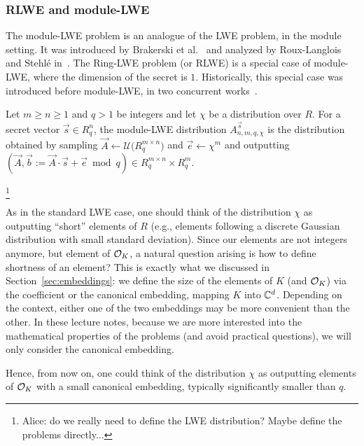 \subsubsection{RLWE and module-LWE}


The module-LWE problem is an analogue of the LWE problem, in the module setting. It was introduced by Brakerski et al.~\cite{MLWE1} and analyzed by Roux-Langlois and Stehlé in~\cite{MLWE2}. The Ring-LWE problem (or RLWE) is a special case of module-LWE, where the dimension of the secret is $1$. Historically, this special case was introduced before module-LWE, in two concurrent works~\cite{RLWE1, RLWE2}.

\begin{definition}
Let $m \geq n \geq 1$ and $q > 1$ be integers and let $\chi$ be a distribution over $R$. For a secret vector $\vec s \in R_q^n$, the module-LWE distribution $A^{\vec s}_{n,m,q,\chi}$ is the distribution obtained by sampling $\vec A \leftarrow \mathcal{U}\Big(R_q^{m \times n}\Big)$ and $\vec e \leftarrow \chi^m$ and outputting $(\vec A, \vec b := \vec A \cdot \vec s + \vec e \bmod q) \in R_q^{m \times n} \times R_q^m$.
\end{definition}

\footnote{Alice: do we really need to define the LWE distribution? Maybe define the problems directly...}

As in the standard LWE case, one should think of the distribution $\chi$ as outputting ``short'' elements of $R$ (e.g., elements following a discrete Gaussian distribution with small standard deviation). Since our elements are not integers anymore, but element of $\mathcal{O}_K$, a natural question arising is how to define shortness of an element? This is exactly what we discussed in Section~\ref{sec:embeddings}: we define the size of the elements of $K$ (and $\mathcal{O}_K$) via the coefficient or the canonical embedding, mapping $K$ into $\mathbb{C}^d$. Depending on the context, either one of the two embeddings may be more convenient than the other. In these lecture notes, because we are more interested into the mathematical properties of the problems (and avoid practical questions), we will only consider the canonical embedding.

Hence, from now on, one could think of the distribution $\chi$ as outputting elements of $\mathcal{O}_K$ with a small canonical embedding, typically significantly smaller than $q$.

